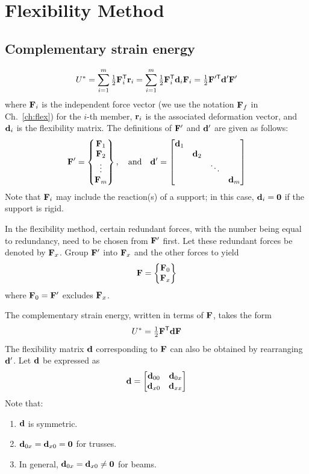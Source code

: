 \chapter{Flexibility Method}
\label{ch:flexmethod}

\section{Complementary strain energy}
\begin{equation}
  U^* = \sum_{i=1}^m\tfrac12\mathbf{F}_i^{\mathsf{T}}\mathbf{r}_i = \sum_{i=1}^m\tfrac12\mathbf{F}_i^{\mathsf{T}}\mathbf{d}_i\mathbf{F}_i = \tfrac12\mathbf{F}'^{\mathsf{T}}\mathbf{d}'\mathbf{F}'
\end{equation}
where $\mathbf{F}_i$ is the independent force vector (we use the notation $\mathbf{F}_f$ in Ch.~\ref{ch:flex}) for the $i$-th member, $\mathbf{r}_i$ is the associated deformation vector, and $\mathbf{d}_i$ is the flexibility matrix. The definitions of $\mathbf{F}'$ and $\mathbf{d}'$ are given as follows:
\begin{equation}
  \mathbf{F}' = \begin{Bmatrix}\mathbf{F}_1\\ \mathbf{F}_2\\ \vdots\\ \mathbf{F}_m\end{Bmatrix},\quad\text{and}\quad \mathbf{d}' = \begin{bmatrix}\mathbf{d}_1 & & & \\ & \mathbf{d}_2 & & \\ & & \ddots & \\ & & & \mathbf{d}_m\end{bmatrix}
\end{equation}
Note that $\mathbf{F}_i$ may include the reaction(s) of a support; in this case, $\mathbf{d}_i = \mathbf{0}$ if the support is rigid.

In the flexibility method, certain redundant forces, with the number being equal to redundancy, need to be chosen from $\mathbf{F}'$ first. Let these redundant forces be denoted by $\mathbf{F}_x$. Group $\mathbf{F}'$ into $\mathbf{F}_x$ and the other forces to yield
\begin{equation}
  \mathbf{F} = \begin{Bmatrix}\mathbf{F}_0\\ \mathbf{F}_x\end{Bmatrix}
\end{equation}
where $\mathbf{F}_0 = \mathbf{F}'$ excludes $\mathbf{F}_x$.

The complementary strain energy, written in terms of $\mathbf{F}$, takes the form
\begin{equation}
  U^* = \tfrac12\mathbf{F}^{\mathsf{T}}\mathbf{d}\mathbf{F}
\end{equation}
The flexibility matrix $\mathbf{d}$ corresponding to $\mathbf{F}$ can also be obtained by rearranging $\mathbf{d}'$. Let $\mathbf{d}$ be expressed as
\begin{equation}
  \mathbf{d} = \begin{bmatrix}\mathbf{d}_{00} & \mathbf{d}_{0x}\\ \mathbf{d}_{x0} & \mathbf{d}_{xx}\end{bmatrix}
\end{equation}
Note that:
\begin{enumerate}
  \item $\mathbf{d}$ is symmetric.
  \item $\mathbf{d}_{0x} = \mathbf{d}_{x0} = \mathbf{0}$ for trusses.
  \item In general, $\mathbf{d}_{0x} = \mathbf{d}_{x0}\neq\mathbf{0}$ for beams.
\end{enumerate}

